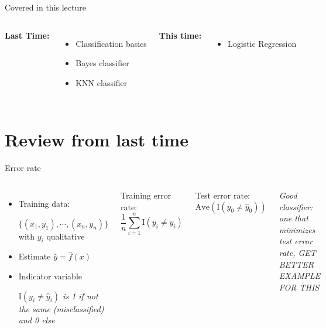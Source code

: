 \documentclass[aspectratio=169,usenames,dvipsnames]{beamer}
\newcommand{\InstructorNotes}[1]{\textit{\color{orange}#1}}
\begin{document}
\begin{frame}[c]{Covered in this lecture }

\begin{columns}
\centering
	\textbf{Last Time:}

	\begin{itemize}
		\item Classification basics 
		\item Bayes classifier
		\item KNN classifier 
	\end{itemize}
\centering
\textbf{This time:}
\begin{itemize}
	
	\item Logistic Regression
\end{itemize}


\end{columns}

\end{frame}

\section{Review from last time}



\begin{frame}[t]{Error rate}



	\begin{columns}
	\centering
	\begin{itemize}
		\item
	Training data:
	
	$\{ (x_1,y_1),\cdots,(x_n,y_n) \}$ with $y_i$ qualitative
	
	\item Estimate $\hat y = \hat f (x)$
	\item Indicator variable
	
	\InstructorNotes{$\mathrm{I}(y_i \neq \hat y_i)$ is 1 if not the same (misclassified) and 0 else}
	\end{itemize}
	
	Training error rate:
	\begin{equation*}
	\frac{1}{n} \sum_{i = 1}^n \mathrm{I}(y_i \neq \hat y_i)
	\end{equation*}
	
	Test error rate:
	\begin{equation*}
		\mathrm{Ave}(\mathrm{I} (y_0 \neq \hat y_0))
	\end{equation*}
	
	\InstructorNotes{Good classifier: one that minimizes test error rate, GET BETTER EXAMPLE FOR THIS}
	
	\end{columns}
	
	\end{frame}
	
\end{document}
